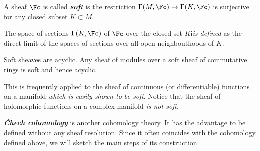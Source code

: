 \begin{defn}
	A sheaf $\Fc$ is called \textbf{\textit{soft}} is the restriction $\Gamma(M,\Fc)\to\Gamma(K,\Fc)$ is surjective for any closed subset $K\subset M$.
	
	The space of sections $\Gamma(K,\Fc)$ of $\Fc$ over the closed set $K$i\textit{is defined} as the direct limit of the spaces of sections over all open neighbouthoods of $K$.
\end{defn}
\begin{prop}
	Soft sheaves are acyclic. Any sheaf of modules over a soft sheaf of commutative rings is soft and hence acyclic.
\end{prop}
\begin{remark}
	This is frequently applied to the sheaf of continuous (or differentiable) functions on a manifold \textit{which is easily shown to be soft}. Notice that the sheaf of holomorphic functions on a complex manifold \textit{is not soft}.
\end{remark}

\textbf{\textit{\v Chech cohomology}} is another cohomology theory. It has the advantage to be defined without any sheaf resolution. Since it often coincides with the cohomology defined above, we will sketch the main steps of its construction.


